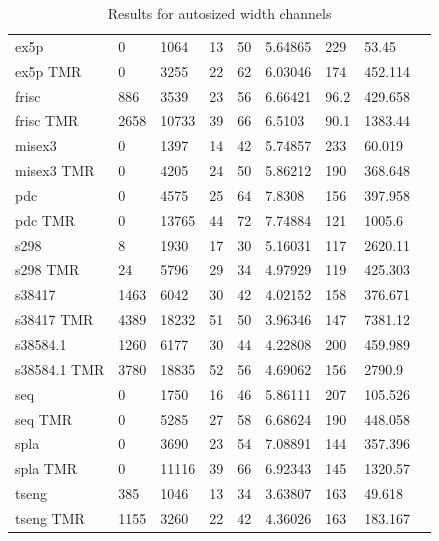 \documentclass[12pt,final,oneside]{memoir} %
\begin{document}
\begin{table}
\begin{adjustwidth}{-1cm}{-1.2cm}
\begin{tabularx}{1.1\textwidth}{XXXXlXXXX}
ex5p & 0 & 1064 & 13 & 50 & 5.64865 & 229 & 53.45\\
ex5p TMR & 0 & 3255 & 22 & 62 & 6.03046 & 174 & 452.114\\\midrule
frisc & 886 & 3539 & 23 & 56 & 6.66421 & 96.2 & 429.658\\
frisc TMR & 2658 & 10733 & 39 & 66 & 6.5103 & 90.1 & 1383.44\\\midrule
misex3 & 0 & 1397 & 14 & 42 & 5.74857 & 233 & 60.019\\
misex3 TMR & 0 & 4205 & 24 & 50 & 5.86212 & 190 & 368.648\\\midrule
pdc & 0 & 4575 & 25 & 64 & 7.8308 & 156 & 397.958\\
pdc TMR & 0 & 13765 & 44 & 72 & 7.74884 & 121 & 1005.6\\\midrule
s298 & 8 & 1930 & 17 & 30 & 5.16031 & 117 & 2620.11\\
s298 TMR & 24 & 5796 & 29 & 34 & 4.97929 & 119 & 425.303\\\midrule
s38417 & 1463 & 6042 & 30 & 42 & 4.02152 & 158 & 376.671\\
s38417 TMR & 4389 & 18232 & 51 & 50 & 3.96346 & 147 & 7381.12\\\midrule
s38584.1 & 1260 & 6177 & 30 & 44 & 4.22808 & 200 & 459.989\\
s38584.1 TMR & 3780 & 18835 & 52 & 56 & 4.69062 & 156 & 2790.9\\\midrule
seq & 0 & 1750 & 16 & 46 & 5.86111 & 207 & 105.526\\
seq TMR & 0 & 5285 & 27 & 58 & 6.68624 & 190 & 448.058\\\midrule
spla & 0 & 3690 & 23 & 54 & 7.08891 & 144 & 357.396\\
spla TMR & 0 & 11116 & 39 & 66 & 6.92343 & 145 & 1320.57\\\midrule
tseng & 385 & 1046 & 13 & 34 & 3.63807 & 163 & 49.618\\
tseng TMR & 1155 & 3260 & 22 & 42 & 4.36026 & 163 & 183.167\\\bottomrule
    \end{tabularx}
    \caption{Results for autosized width channels}
    \label{Results-1}
\end{adjustwidth}
\end{table}


\end{document}
